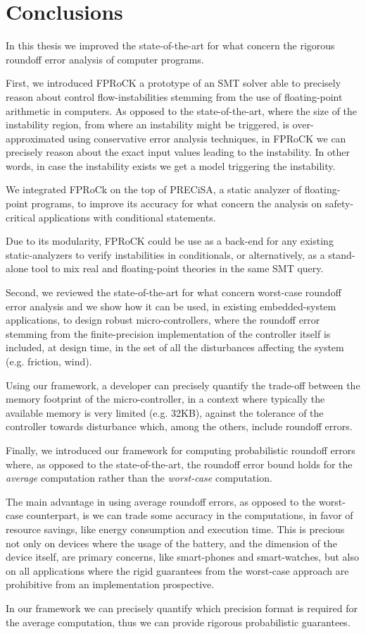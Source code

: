 
\chapter{Conclusions}
\label{sec:conclusion}
In this thesis we improved the state-of-the-art for what concern the rigorous roundoff error analysis of computer programs.
%

First, we introduced FPRoCK a prototype of an SMT solver able to precisely reason about control flow-instabilities stemming from the use of floating-point arithmetic in computers.
%
As opposed to the state-of-the-art, where the size of the instability region, from where an instability might be triggered, is over-approximated using conservative error analysis techniques, in FPRoCK we can precisely reason about the exact input values leading to the instability. 
%
In other words, in case the instability exists we get a model triggering the instability.
%

We integrated FPRoCk on the top of PRECiSA, a static analyzer of floating-point programs, to improve its accuracy for what concern the analysis on safety-critical applications with conditional statements.
%

Due to its modularity, FPRoCK could be use as a back-end for any existing static-analyzers to verify instabilities in conditionals, or alternatively, as a stand-alone tool to mix real and floating-point theories in the same SMT query.
%

Second, we reviewed the state-of-the-art for what concern worst-case roundoff error analysis and we show how it can be used, in existing embedded-system applications, to design robust micro-controllers, where the roundoff error stemming from the finite-precision implementation of the controller itself is included, at design time, in the set of all the disturbances affecting the system (e.g. friction, wind).
%

Using our framework, a developer can precisely quantify the trade-off between the memory footprint of the micro-controller, in a context where typically the available memory is very limited (e.g. 32KB), against the tolerance of the controller towards disturbance which, among the others, include roundoff errors. 
%

Finally, we introduced our framework for computing probabilistic roundoff errors where, as opposed to the state-of-the-art, the roundoff error bound holds for the \emph{average} computation rather than the \emph{worst-case} computation.
%

The main advantage in using average roundoff errors, as opposed to the worst-case counterpart, is we can trade some accuracy in the computations, in favor of resource savings, like energy consumption and execution time.
%
This is precious not only on devices where the usage of the battery, and the dimension of the device itself, are primary concerns, like smart-phones and smart-watches, but also on all applications where the rigid guarantees from the worst-case approach are prohibitive from an implementation prospective.
%

In our framework we can precisely quantify which precision format is required for the average computation, thus we can provide rigorous probabilistic guarantees.
%